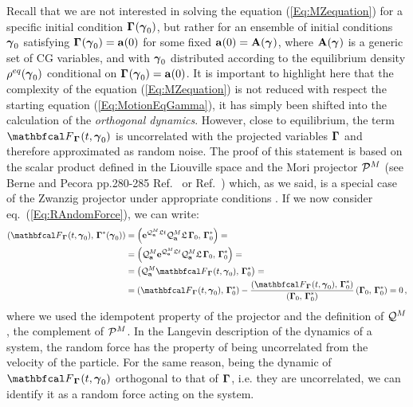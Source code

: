\documentclass[10pt,a4paper]{book}
\theoremstyle{definition}
\begin{document}
Recall that we are not interested in solving the equation (\ref{Eq:MZequation}) for a specific initial condition $\boldsymbol\Gamma_{}(\boldsymbol\gamma_{0})$, but rather for an ensemble of initial conditions $\boldsymbol\gamma_{0}$ satisfying $\boldsymbol\Gamma_{}(\boldsymbol\gamma_{0})=\mathbf{a}(0)$ for some fixed $\mathbf{a}(0)=\mathbf{A}(\boldsymbol\gamma_{})$, where $\mathbf{A}(\boldsymbol\gamma_{})$ is a generic set of CG variables, and with $\boldsymbol\gamma_{0}$ distributed according to the equilibrium density $\rho^{eq}(\boldsymbol\gamma_{0})$ conditional on $\boldsymbol\Gamma_{}(\boldsymbol\gamma_{0})=\mathbf{a}(0)$. It is important to highlight here that the complexity of the equation (\ref{Eq:MZequation}) is not reduced with respect the starting equation (\ref{Eq:MotionEqGamma}), it has simply been shifted into the calculation of the \emph{orthogonal dynamics}. However, close to equilibrium, the term $\fprojbf_{\Bphase{}}(t,\Aphase{0})$ is uncorrelated with the projected variables $\boldsymbol\Gamma_{}$ and therefore approximated as random noise. 
The proof of this statement is based on the scalar product defined in the Liouville space and the Mori projector $\mathcal{P}^{M}$ (see Berne and Pecora pp.280-285 Ref.~\cite{Berne:DynamicLightScatt} or Ref.~\cite{hansen2006,tuckerman2010}) which, as we said, is a special case of the Zwanzig projector under appropriate conditions \cite{Kauzlaric2011}. If we now consider eq.~(\ref{Eq:RAndomForce}), we can write:
\begin{equation*}
\begin{split}
 \cip{ \fprojbf_{\Bphase{}}(t,\Aphase{0}) ,\, \Bphase{}^*(\Aphase{0}) } &= 
    \cip{ \exp{\qproj_{\bfa}^M\Lio t}\qproj_{\bfa}^M\Lio\,\Bphase{0} ,\, \Bphase{0}^* } = \\
  &= \cip{ \qproj_{\bfa}^M\exp{\qproj_{\bfa}^M\Lio t}\qproj_{\bfa}^M\Lio\,\Bphase{0} ,\, \Bphase{0}^* } = \\
  &= \cip{ \qproj_{\bfa}^M \fprojbf_{\Bphase{}}(t,\Aphase{0}) ,\, \Bphase{0}^* } = \\
  &= \cip{\fprojbf_{\Bphase{}}(t,\Aphase{0}) ,\, \Bphase{0}^* } - 
  \frac{\cip{\fprojbf_{\Bphase{}}(t,\Aphase{0}) ,\, \Bphase{0}^* }}{\cip{\Bphase{0} ,\, \Bphase{0}^* }}\cip{\Bphase{0} ,\, \Bphase{0}^* } =
  0\,,
\end{split}
\end{equation*}
where we used the idempotent property of the projector and the definition of $\mathcal{Q}^M$, the complement of $\mathcal{P}^M$.
In the Langevin description of the dynamics of a system, the random force has the property of being uncorrelated from the velocity of the particle. For the same reason, being the dynamic of $\fprojbf_{\Bphase{}}(t,\Aphase{0})$ orthogonal to that of $\boldsymbol\Gamma_{}$, i.e. they are uncorrelated, we can identify it as a random force acting on the system.
\end{document}
